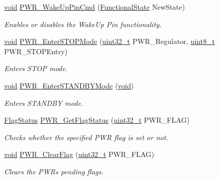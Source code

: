 \begin{DoxyCompactItemize}
\hyperlink{usb__devapi_8h_afabf60e7f57651d6d595a02c75f07cd0}{void} \hyperlink{group___p_w_r___private___functions_gae5fd6f9336ef8c60d5483651cb0d1a00}{P\+W\+R\+\_\+\+Wake\+Up\+Pin\+Cmd} (\hyperlink{agilefox_2library_2inc_2stm32f10x__type_8h_ac9a7e9a35d2513ec15c3b537aaa4fba1}{Functional\+State} New\+State)
\begin{DoxyCompactList}\small\item\em Enables or disables the Wake\+Up Pin functionality. \end{DoxyCompactList}\item 
\hyperlink{usb__devapi_8h_afabf60e7f57651d6d595a02c75f07cd0}{void} \hyperlink{group___p_w_r___private___functions_ga694676ac06a9baf50eae45adae0118ab}{P\+W\+R\+\_\+\+Enter\+S\+T\+O\+P\+Mode} (\hyperlink{_p_e___types_8h_a33594304e786b158f3fb30289278f5af}{uint32\+\_\+t} P\+W\+R\+\_\+\+Regulator, \hyperlink{_p_e___types_8h_aba7bc1797add20fe3efdf37ced1182c5}{uint8\+\_\+t} P\+W\+R\+\_\+\+S\+T\+O\+P\+Entry)
\begin{DoxyCompactList}\small\item\em Enters S\+T\+OP mode. \end{DoxyCompactList}\item 
\hyperlink{usb__devapi_8h_afabf60e7f57651d6d595a02c75f07cd0}{void} \hyperlink{group___p_w_r___private___functions_ga00ddae00a9c327b81b24d2597b0052f3}{P\+W\+R\+\_\+\+Enter\+S\+T\+A\+N\+D\+B\+Y\+Mode} (\hyperlink{usb__devapi_8h_afabf60e7f57651d6d595a02c75f07cd0}{void})
\begin{DoxyCompactList}\small\item\em Enters S\+T\+A\+N\+D\+BY mode. \end{DoxyCompactList}\item 
\hyperlink{agilefox_2library_2inc_2stm32f10x__type_8h_a89136caac2e14c55151f527ac02daaff}{Flag\+Status} \hyperlink{group___p_w_r___private___functions_gaa980163a4d83304280ee34942464b4ec}{P\+W\+R\+\_\+\+Get\+Flag\+Status} (\hyperlink{_p_e___types_8h_a33594304e786b158f3fb30289278f5af}{uint32\+\_\+t} P\+W\+R\+\_\+\+F\+L\+AG)
\begin{DoxyCompactList}\small\item\em Checks whether the specified P\+WR flag is set or not. \end{DoxyCompactList}\item 
\hyperlink{usb__devapi_8h_afabf60e7f57651d6d595a02c75f07cd0}{void} \hyperlink{group___p_w_r___private___functions_ga01c4b2fbd16514b993324e101c3ddf7c}{P\+W\+R\+\_\+\+Clear\+Flag} (\hyperlink{_p_e___types_8h_a33594304e786b158f3fb30289278f5af}{uint32\+\_\+t} P\+W\+R\+\_\+\+F\+L\+AG)
\begin{DoxyCompactList}\small\item\em Clears the P\+WR\textquotesingle{}s pending flags. \end{DoxyCompactList}\end{DoxyCompactItemize}
